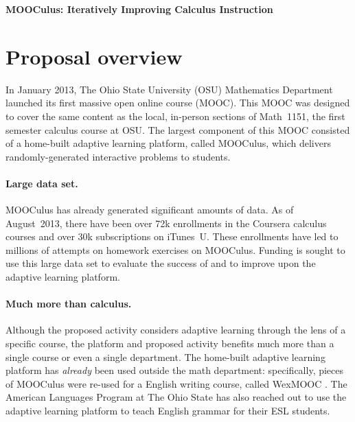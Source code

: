 \documentclass[12pt]{article}
\begin{document}
\begin{center}
  \textbf{MOOCulus: Iteratively Improving Calculus Instruction}
\end{center}

% 

\section{Proposal overview}

In January 2013, The Ohio State University (OSU) Mathematics
Department launched its first massive open online course (MOOC).  This
MOOC was designed to cover the same content as the local, in-person
sections of Math~1151, the first semester calculus course at OSU.  The
largest component of this MOOC consisted of a home-built adaptive
learning platform, called MOOCulus, which delivers randomly-generated
interactive problems to students.

\paragraph*{Large data set.} MOOCulus has already generated
significant amounts of data.  As of August~2013, there have been over
72k enrollments in the Coursera calculus courses and over 30k
subscriptions on iTunes~U.  These enrollments have led to millions of
attempts on homework exercises on MOOCulus.  Funding is sought to use
this large data set to evaluate the success of and to improve upon the
adaptive learning platform.

\paragraph*{Much more than calculus.} Although the proposed activity
considers adaptive learning through the lens of a specific course, the
platform and proposed activity benefits much more than a single course
or even a single department.  The home-built adaptive learning
platform has \textit{already} been used outside the math department:
specifically, pieces of MOOCulus were re-used for a English writing
course, called WexMOOC \parencite{gates-foundation-grant}.  The
American Languages Program at The Ohio State has also reached out to
use the adaptive learning platform to teach English grammar for their
ESL students.  
\end{document}
